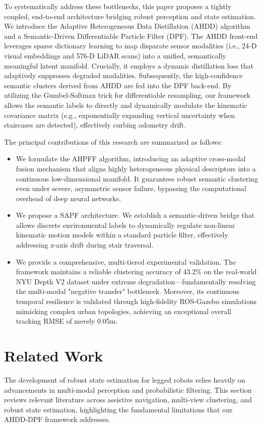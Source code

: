 \documentclass[final,3p,times]{elsarticle}
\begin{document}
To systematically address these bottlenecks, this paper proposes a tightly coupled, end-to-end architecture bridging robust perception and state estimation. We introduce the Adaptive Heterogeneous Data Distillation (AHDD) algorithm and a Semantic-Driven Differentiable Particle Filter (DPF). The AHDD front-end leverages sparse dictionary learning to map disparate sensor modalities (i.e., 24-D visual embeddings and 576-D LiDAR scans) into a unified, semantically meaningful latent manifold. Crucially, it employs a dynamic distillation loss that adaptively suppresses degraded modalities. Subsequently, the high-confidence semantic clusters derived from AHDD are fed into the DPF back-end. By utilizing the Gumbel-Softmax trick for differentiable resampling, our framework allows the semantic labels to directly and dynamically modulate the kinematic covariance matrix (e.g., exponentially expanding vertical uncertainty when staircases are detected), effectively curbing odometry drift.

The principal contributions of this research are summarized as follows:
\begin{itemize}
    \item We formulate the AHPFF algorithm, introducing an adaptive cross-modal fusion mechanism that aligns highly heterogeneous physical descriptors into a continuous low-dimensional manifold. It guarantees robust semantic clustering even under severe, asymmetric sensor failure, bypassing the computational overhead of deep neural networks.
    \item We propose a SAPF architecture. We establish a semantic-driven bridge that allows discrete environmental labels to dynamically regulate non-linear kinematic motion models within a standard particle filter, effectively addressing z-axis drift during stair traversal.
    \item We provide a comprehensive, multi-tiered experimental validation. The framework maintains a reliable clustering accuracy of 43.2\% on the real-world NYU Depth V2 dataset under extreme degradation—fundamentally resolving the multi-modal "negative transfer" bottleneck. Moreover, its continuous temporal resilience is validated through high-fidelity ROS-Gazebo simulations mimicking complex urban topologies, achieving an exceptional overall tracking RMSE of merely 0.05m.
\end{itemize}

\section{Related Work}
\label{sec:related_work}
The development of robust state estimation for legged robots relies heavily on advancements in multi-modal perception and probabilistic filtering. This section reviews relevant literature across assistive navigation, multi-view clustering, and robust state estimation, highlighting the fundamental limitations that our AHDD-DPF framework addresses.
\end{document}
